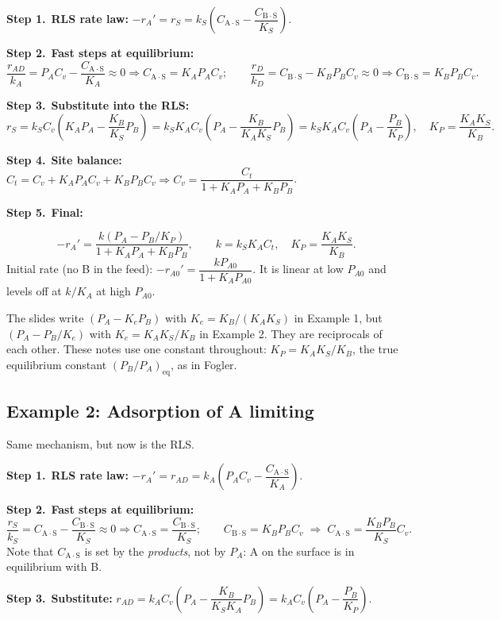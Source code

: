 \documentclass[11pt]{article}
\newcommand{\step}[1]{\par\smallskip\textcolor{stepgray}{\textbf{Step #1.}}\ }
\newcommand{\AS}[1]{\mathrm{#1\!\cdot\!S}}
\begin{document}
\step{1}\textbf{RLS rate law:} $-r_A'=r_S=k_S\left(C_{\AS{A}}-\dfrac{C_{\AS{B}}}{K_S}\right)$.

\step{2}\textbf{Fast steps at equilibrium:}
\[
\frac{r_{AD}}{k_A}=P_AC_v-\frac{C_{\AS{A}}}{K_A}\approx0\Rightarrow C_{\AS{A}}=K_AP_AC_v;\qquad
\frac{r_D}{k_D}=C_{\AS{B}}-K_BP_BC_v\approx0\Rightarrow C_{\AS{B}}=K_BP_BC_v.
\]
\step{3}\textbf{Substitute into the RLS:}
\[
r_S=k_SC_v\left(K_AP_A-\frac{K_B}{K_S}P_B\right)=k_SK_AC_v\left(P_A-\frac{K_B}{K_AK_S}P_B\right)=k_SK_AC_v\left(P_A-\frac{P_B}{K_P}\right),
\quad K_P=\frac{K_AK_S}{K_B}.
\]
\step{4}\textbf{Site balance:} $C_t=C_v+K_AP_AC_v+K_BP_BC_v\Rightarrow C_v=\dfrac{C_t}{1+K_AP_A+K_BP_B}$.

\step{5}\textbf{Final:}
\begin{keyresult}
\[
-r_A'=\frac{k\left(P_A-P_B/K_P\right)}{1+K_AP_A+K_BP_B},\qquad k=k_SK_AC_t,\quad K_P=\frac{K_AK_S}{K_B}.
\]
Initial rate (no B in the feed): $-r_{A0}'=\dfrac{kP_{A0}}{1+K_AP_{A0}}$. It is linear at low $P_{A0}$ and levels off at $k/K_A$ at high $P_{A0}$.
\end{keyresult}
\begin{mistake}
The slides write $(P_A-K_eP_B)$ with $K_e=K_B/(K_AK_S)$ in Example 1, but $(P_A-P_B/K_e)$ with $K_e=K_AK_S/K_B$ in
Example 2. They are reciprocals of each other. These notes use one constant throughout: $K_P=K_AK_S/K_B$, the true
equilibrium constant $(P_B/P_A)_{\text{eq}}$, as in Fogler.
\end{mistake}

\subsection{Example 2: Adsorption of A limiting}
Same mechanism, but now \underline{} is the RLS.

\step{1}\textbf{RLS rate law:} $-r_A'=r_{AD}=k_A\left(P_AC_v-\dfrac{C_{\AS{A}}}{K_A}\right)$.

\step{2}\textbf{Fast steps at equilibrium:}
\[
\frac{r_S}{k_S}=C_{\AS{A}}-\frac{C_{\AS{B}}}{K_S}\approx0\Rightarrow C_{\AS{A}}=\frac{C_{\AS{B}}}{K_S};\qquad
C_{\AS{B}}=K_BP_BC_v\;\Rightarrow\;C_{\AS{A}}=\frac{K_BP_B}{K_S}C_v .
\]
Note that $C_{\AS{A}}$ is set by the \emph{products}, not by $P_A$: A on the surface is in equilibrium with B.

\step{3}\textbf{Substitute:}
$r_{AD}=k_AC_v\left(P_A-\dfrac{K_B}{K_SK_A}P_B\right)=k_AC_v\left(P_A-\dfrac{P_B}{K_P}\right)$.
\end{document}
